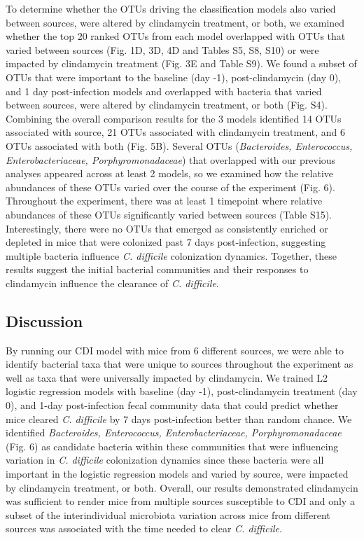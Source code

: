 \documentclass[
  11pt,
]{article}
\begin{document}
To determine whether the OTUs driving the classification models also
varied between sources, were altered by clindamycin treatment, or both,
we examined whether the top 20 ranked OTUs from each model overlapped
with OTUs that varied between sources (Fig. 1D, 3D, 4D and Tables S5,
S8, S10) or were impacted by clindamycin treatment (Fig. 3E and Table
S9). We found a subset of OTUs that were important to the baseline (day
-1), post-clindamycin (day 0), and 1 day post-infection models and
overlapped with bacteria that varied between sources, were altered by
clindamycin treatment, or both (Fig. S4). Combining the overall
comparison results for the 3 models identified 14 OTUs associated with
source, 21 OTUs associated with clindamycin treatment, and 6 OTUs
associated with both (Fig. 5B). Several OTUs (\emph{Bacteroides,
Enterococcus, Enterobacteriaceae, Porphyromonadaceae}) that overlapped
with our previous analyses appeared across at least 2 models, so we
examined how the relative abundances of these OTUs varied over the
course of the experiment (Fig. 6). Throughout the experiment, there was
at least 1 timepoint where relative abundances of these OTUs
significantly varied between sources (Table S15). Interestingly, there
were no OTUs that emerged as consistently enriched or depleted in mice
that were colonized past 7 days post-infection, suggesting multiple
bacteria influence \emph{C. difficile} colonization dynamics. Together,
these results suggest the initial bacterial communities and their
responses to clindamycin influence the clearance of \emph{C. difficile}.

\hypertarget{discussion}{%
\subsection{Discussion}\label{discussion}}

By running our CDI model with mice from 6 different sources, we were
able to identify bacterial taxa that were unique to sources throughout
the experiment as well as taxa that were universally impacted by
clindamycin. We trained L2 logistic regression models with baseline (day
-1), post-clindamycin treatment (day 0), and 1-day post-infection fecal
community data that could predict whether mice cleared \emph{C.
difficile} by 7 days post-infection better than random chance. We
identified \emph{Bacteroides, Enterococcus, Enterobacteriaceae,
Porphyromonadaceae} (Fig. 6) as candidate bacteria within these
communities that were influencing variation in \emph{C. difficile}
colonization dynamics since these bacteria were all important in the
logistic regression models and varied by source, were impacted by
clindamycin treatment, or both. Overall, our results demonstrated
clindamycin was sufficient to render mice from multiple sources
susceptible to CDI and only a subset of the interindividual microbiota
variation across mice from different sources was associated with the
time needed to clear \emph{C. difficile}.
\end{document}
